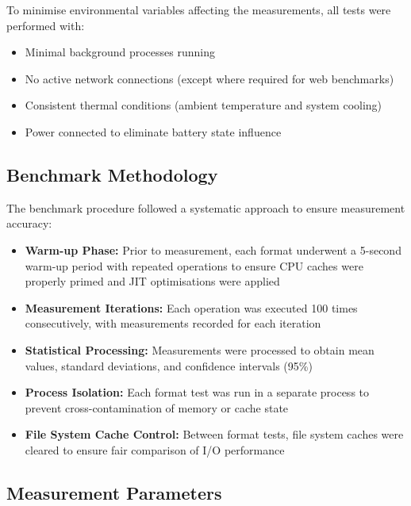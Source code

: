 To minimise environmental variables affecting the measurements, all tests were performed with:
\begin{itemize}
  \item Minimal background processes running
  \item No active network connections (except where required for web benchmarks)
  \item Consistent thermal conditions (ambient temperature and system cooling)
  \item Power connected to eliminate battery state influence
\end{itemize}

\subsection{Benchmark Methodology}
\label{result:benchmark_on_local_environment:benchmark_methodology}

The benchmark procedure followed a systematic approach to ensure measurement accuracy:

\begin{itemize}
  \item \textbf{Warm-up Phase:} Prior to measurement, each format underwent a 5-second warm-up period with repeated operations to ensure CPU caches were properly primed and JIT optimisations were applied

  \item \textbf{Measurement Iterations:} Each operation was executed 100 times consecutively, with measurements recorded for each iteration

  \item \textbf{Statistical Processing:} Measurements were processed to obtain mean values, standard deviations, and confidence intervals (95\%)

  \item \textbf{Process Isolation:} Each format test was run in a separate process to prevent cross-contamination of memory or cache state

  \item \textbf{File System Cache Control:} Between format tests, file system caches were cleared to ensure fair comparison of I/O performance
\end{itemize}

\subsection{Measurement Parameters}
\label{result:benchmark_on_local_environment:measurement_parameters}


